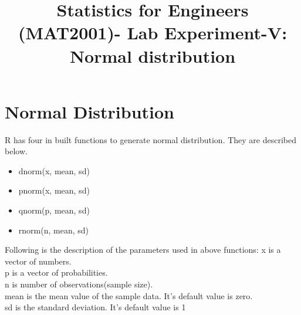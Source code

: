 \documentclass{article}\usepackage[]{graphicx}\usepackage[]{xcolor}
\date{}
\title{Statistics for Engineers (MAT2001)- Lab  Experiment-V:  Normal distribution}
\begin{document}
\maketitle

\section{Normal Distribution}

R has four in built functions to generate normal distribution. They are described below.

	\begin{itemize}
		\item dnorm(x, mean, sd)
		\item pnorm(x, mean, sd) 
		\item qnorm(p, mean, sd) 
		\item rnorm(n, mean, sd)
		
	\end{itemize} 
Following is the description of the parameters used in above functions:
 x is a vector of numbers.\\
p is a vector of probabilities.\\
n is number of observations(sample size).\\
mean is the mean value of the sample data. It's default value is zero.\\
sd is the standard deviation. It's default value is 1\\
\end{document}

